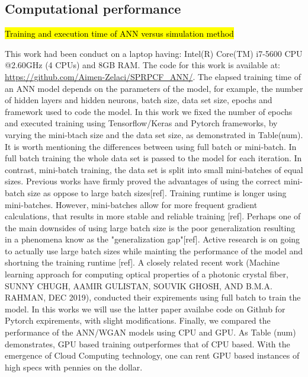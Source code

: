 \documentclass[draft, a4, 10pt, onecolumn]{IEEEtran}
\begin{document}
\subsection{Computational performance}

\hl{Training and execution time of ANN versus simulation method}


This work had been conduct on a  laptop having: Intel(R) Core(TM) i7-5600 CPU @2.60GHz (4 CPUs) and 8GB RAM. The code for this work is available at: \url{https://github.com/Aimen-Zelaci/SPRPCF_ANN/}.
\newline
The elapsed training time of an ANN model depends on the parameters of the model, for example, the number of hidden layers and hidden neurons, batch size, data set size, epochs and framework used to code the model.
In this work we fixed the number of epochs and executed training using Tensorflow/Keras and Pytorch frameworks, by varying the mini-btach size and the data set size, as demonstrated in Table(num). It is worth mentioning the differences between using full batch or mini-batch. In full batch training the whole data set is passed to the model for each iteration. In contrast, mini-batch training, the data set is split into small mini-batches of equal sizes. Previous works have firmly proved the advantages of using the correct mini-batch size as oppose to large batch sizes[ref]. Training runtime is longer using mini-batches. However, mini-batches allow for more frequent gradient calculations, that results in more stable and reliable training [ref]. Perhaps one of the main downsides of using large batch size is the poor generalization resulting in a phenomena know as the "generalization gap"[ref]. Active research is on going to actually use large batch sizes while mainting the performance of the model and shortning the training runtime [ref]. A closely related recent work (Machine learning approach for computing optical properties of a photonic crystal fiber, SUNNY CHUGH, AAMIR GULISTAN, SOUVIK GHOSH, AND B.M.A. RAHMAN, DEC 2019), conducted their expirements using full batch to train the model. In this works we will use the latter paper availabe code on Github for Pytorch expirements, with slight modifications. Finally, we compared the performance of the ANN/WGAN models using CPU and GPU. As Table (num) demonstrates, GPU based training outperformes that of CPU based. With the emergence of Cloud Computing technology, one can rent GPU based instances of high specs with pennies on the dollar.
\end{document}
